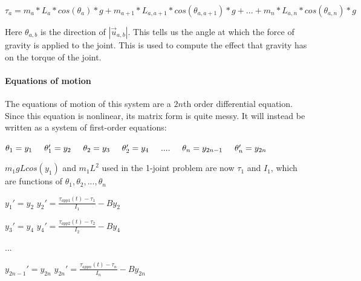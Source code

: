 \documentclass{article}
\begin{document}
$\tau_a = m_a*L_{a}*cos(\theta_a)*g + m_{a+1}*L_{a,a+1}*cos(\theta_{a,a+1})*g + ... + m_{n}*L_{a,n}*cos(\theta_{a,n})*g$

\vspace{24pt}
Here $\theta_{a,b}$ is the direction of $|\vec{u}_{a,b}|$. This tells us the angle at which the force of gravity is applied to the joint. This is used to compute the effect that gravity has on the torque of the joint. 

\vspace{24pt}

\paragraph{Equations of motion} 
\noindent \justifying The equations of motion of this system are a $2n$th order differential equation. Since this equation is nonlinear, its matrix form is quite messy. It will instead be written as a system of first-order equations:

\vspace{24pt}
\centering $\theta_1 = y_1  \hspace{0.5cm}  \theta_1' = y_2  \hspace{0.5cm}  \theta_2 = y_3  \hspace{0.5cm}  \theta_2' = y_4 \hspace{0.5cm} ....\hspace{0.5cm} \theta_n = y_{2n-1} \hspace{0.5cm} \theta_n' = y_{2n}$

\vspace{24pt}
\noindent \justifying $m_1gLcos(y_1)$ and ${m_1L^2}$ used in the 1-joint problem are now $\tau_1$ and $I_1$, which are functions of $\theta_1, \theta_2, ..., \theta_n$
\vspace{24pt}

\centering$y_1' = y_2$   \hspace{1cm}  $y_2' = \frac{\tau_{app1}(t) - \tau_1}{I_1} - By_2$ 

\vspace{10pt}

\centering$y_3' = y_4$   \hspace{1cm}  $y_4' = \frac{\tau_{app2}(t) - \tau_2}{I_2} - By_4$

\vspace{10pt}

\centering $...$

\vspace{10pt}

\centering$y_{2n-1}' = y_{2n}$   \hspace{1cm}  $y_{2n}' = \frac{\tau_{appn}(t) - \tau_n}{I_n} - By_{2n}$ \\ 
\end{document}
